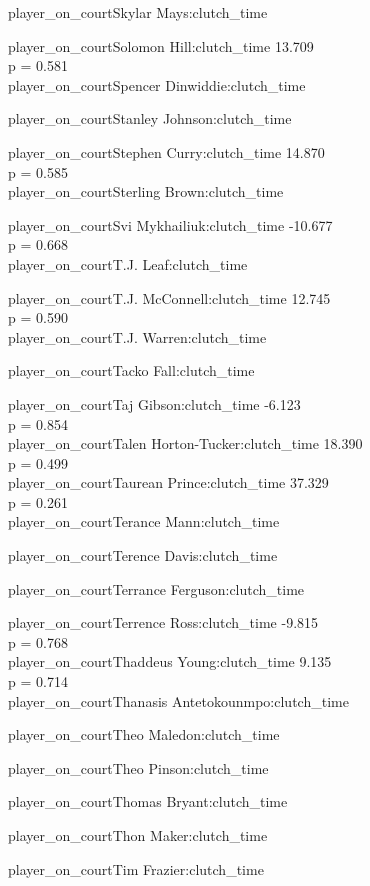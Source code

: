 \documentclass[
  landscape]{article}
\begin{document}
player\_on\_courtSkylar Mays:clutch\_time

player\_on\_courtSolomon Hill:clutch\_time 13.709\\
p = 0.581\\
player\_on\_courtSpencer Dinwiddie:clutch\_time

player\_on\_courtStanley Johnson:clutch\_time

player\_on\_courtStephen Curry:clutch\_time 14.870\\
p = 0.585\\
player\_on\_courtSterling Brown:clutch\_time

player\_on\_courtSvi Mykhailiuk:clutch\_time -10.677\\
p = 0.668\\
player\_on\_courtT.J. Leaf:clutch\_time

player\_on\_courtT.J. McConnell:clutch\_time 12.745\\
p = 0.590\\
player\_on\_courtT.J. Warren:clutch\_time

player\_on\_courtTacko Fall:clutch\_time

player\_on\_courtTaj Gibson:clutch\_time -6.123\\
p = 0.854\\
player\_on\_courtTalen Horton-Tucker:clutch\_time 18.390\\
p = 0.499\\
player\_on\_courtTaurean Prince:clutch\_time 37.329\\
p = 0.261\\
player\_on\_courtTerance Mann:clutch\_time

player\_on\_courtTerence Davis:clutch\_time

player\_on\_courtTerrance Ferguson:clutch\_time

player\_on\_courtTerrence Ross:clutch\_time -9.815\\
p = 0.768\\
player\_on\_courtThaddeus Young:clutch\_time 9.135\\
p = 0.714\\
player\_on\_courtThanasis Antetokounmpo:clutch\_time

player\_on\_courtTheo Maledon:clutch\_time

player\_on\_courtTheo Pinson:clutch\_time

player\_on\_courtThomas Bryant:clutch\_time

player\_on\_courtThon Maker:clutch\_time

player\_on\_courtTim Frazier:clutch\_time
\end{document}
